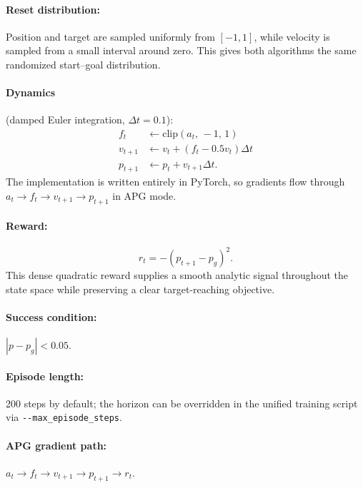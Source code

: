\documentclass[11pt,a4paper]{article}
\begin{document}
\paragraph{Reset distribution:} Position and target are sampled uniformly from $[-1,1]$, while velocity is sampled from a small interval around zero. This gives both algorithms the same randomized start--goal distribution.

\paragraph{Dynamics} (damped Euler integration, $\Delta t = 0.1$):
\begin{align}
  f_t &\leftarrow \text{clip}(a_t,\,-1,\,1) \\
  v_{t+1} &\leftarrow v_t + (f_t - 0.5 v_t)\Delta t \\
  p_{t+1} &\leftarrow p_t + v_{t+1}\Delta t .
\end{align}
The implementation is written entirely in PyTorch, so gradients flow through $a_t \rightarrow f_t \rightarrow v_{t+1} \rightarrow p_{t+1}$ in APG mode.

\paragraph{Reward:}
\begin{equation}
  r_t = -\left(p_{t+1} - p_g\right)^2 .
  \label{eq:pms_reward}
\end{equation}
This dense quadratic reward supplies a smooth analytic signal throughout the state space while preserving a clear target-reaching objective.

\paragraph{Success condition:} $|p - p_g| < 0.05$.

\paragraph{Episode length:} 200 steps by default; the horizon can be overridden in the unified training script via \texttt{-{}-max\_episode\_steps}.

\paragraph{APG gradient path:} $a_t \rightarrow f_t \rightarrow v_{t+1} \rightarrow p_{t+1} \rightarrow r_t$.
\end{document}
